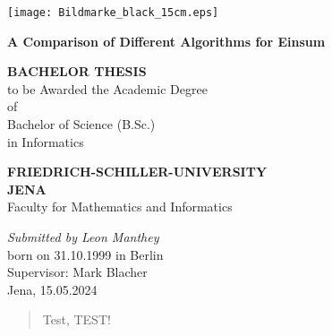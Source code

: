\documentclass[12pt]{report}
\begin{document}
\begin{titlepage}
    \begin{center}
    
    \begin{spacing}{1.5}
        \texttt{[image: Bildmarke\_black\_15cm.eps]}
        \vspace*{\fill}
    \end{spacing}
    \begin{spacing}{2.5}
        \textbf{\huge A Comparison of Different Algorithms for Einsum}\\[0.5cm]
        \vspace*{\fill}
        \begin{spacing}{1.5}
            \textbf{BACHELOR THESIS\\}
            to be Awarded the Academic Degree\\
            of\\
            Bachelor of Science (B.Sc.)\\
            in Informatics\\
        \end{spacing}
    \end{spacing}

    \vspace*{\fill}

    \begin{spacing}{1.15}
    \textbf{FRIEDRICH-SCHILLER-UNIVERSITY\\JENA\\}
    Faculty for Mathematics and Informatics
    
    \vspace*{\fill}
    
    \textit{Submitted by Leon Manthey}\\
    born on 31.10.1999 in Berlin\\
    Supervisor: Mark Blacher\\
    Jena, 15.05.2024
    
    \end{spacing}
    \end{center}
    \end{titlepage}

    \begin{abstract}
        Test, TEST!
    \end{abstract}
\end{document}
